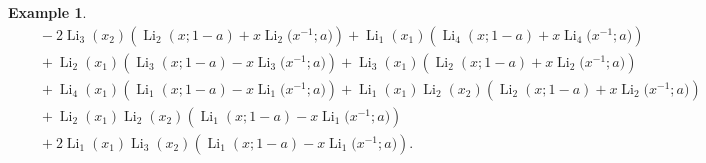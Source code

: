 \documentclass[11pt]{article}
\DeclareMathOperator{\Li}{Li}
\theoremstyle{plain}
\theoremstyle{definition}
\newtheorem{exa}[thm]{Example}
\begin{document}
\begin{exa}
\begin{align*}
	&\quad-2\Li_{3}(x_2)\left(\Li_{2}(x;1-a)+x\Li_{2}\Big(x^{-1};a\Big)\right)+\Li_{1}(x_1)\left(\Li_{4}(x;1-a)+x\Li_{4}\Big(x^{-1};a\Big)\right)\\
	&\quad+\Li_{2}(x_1)\left(\Li_{3}(x;1-a)-x\Li_{3}\Big(x^{-1};a\Big)\right)+\Li_{3}(x_1)\left(\Li_{2}(x;1-a)+x\Li_{2}\Big(x^{-1};a\Big)\right)\\
	&\quad+\Li_{4}(x_1)\left(\Li_{1}(x;1-a)-x\Li_{1}\Big(x^{-1};a\Big)\right)+\Li_{1}(x_1)\Li_{2}(x_2)\left(\Li_{2}(x;1-a)+x \Li_{2}\Big(x^{-1};a\Big)\right)\\
	&\quad+\Li_{2}(x_1)\Li_{2}(x_2)\left(\Li_{1}(x;1-a)-x\Li_{1}\Big(x^{-1};a\Big)\right)\\
	&\quad+2\Li_{1}(x_1)\Li_{3}(x_2)\left(\Li_{1}(x;1-a)-x\Li_{1}\Big(x^{-1};a\Big)\right).
\end{align*}
\end{exa}
\end{document}

